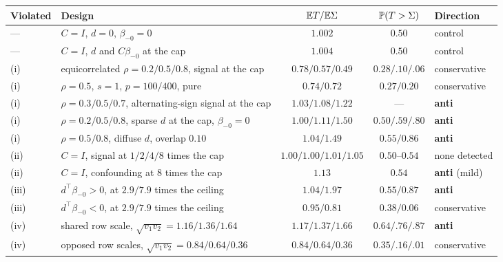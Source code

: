 {\begin{center}
\small
\setlength{\tabcolsep}{3pt}
\begin{tabular}{llccl}
\hline
Violated & Design & $\mathbb{E} T / \mathbb{E} \Sigma$ & $\mathbb{P}(T > \Sigma)$ & Direction
\\
\hline
--- & $C = I$, $d = 0$, $\beta_{-0} = 0$
  & $1.002$ & $0.50$ & control \\
--- & $C = I$, $d$ and $C\beta_{-0}$ at the cap
  & $1.004$ & $0.50$ & control \\[2pt]
(i) & equicorrelated $\rho = 0.2 / 0.5 / 0.8$, signal at the cap
  & $0.78 / 0.57 / 0.49$ & $0.28 / .10 / .06$ & conservative \\
(i) & $\rho = 0.5$, $s = 1$, $p = 100 / 400$, pure
  & $0.74 / 0.72$ & $0.27 / 0.20$ & conservative \\
(i) & $\rho = 0.3 / 0.5 / 0.7$, alternating-sign signal at the cap
  & $\mathbf{1.03 / 1.08 / 1.22}$ & --- & \textbf{anti} \\
(i) & $\rho = 0.2 / 0.5 / 0.8$, sparse $d$ at the cap, $\beta_{-0} = 0$
  & $\mathbf{1.00 / 1.11 / 1.50}$ & $0.50 / .59 / .80$ & \textbf{anti} \\
(i) & $\rho = 0.5 / 0.8$, diffuse $d$, overlap $0.10$
  & $\mathbf{1.04 / 1.49}$ & $0.55 / 0.86$ & \textbf{anti} \\[2pt]
(ii) & $C = I$, signal at $1/2/4/8$ times the cap
  & $1.00 / 1.00 / 1.01 / 1.05$ & $0.50$--$0.54$ & none detected \\
(ii) & $C = I$, confounding at $8$ times the cap
  & $1.13$ & $0.54$ & \textbf{anti} (mild) \\[2pt]
(iii) & $d^\top\beta_{-0} > 0$, at $2.9 / 7.9$ times the ceiling
  & $\mathbf{1.04 / 1.97}$ & $0.55 / 0.87$ & \textbf{anti} \\
(iii) & $d^\top\beta_{-0} < 0$, at $2.9 / 7.9$ times the ceiling
  & $0.95 / 0.81$ & $0.38 / 0.06$ & conservative \\[2pt]
(iv) & shared row scale, $\sqrt{v_1 v_2} = 1.16 / 1.36 / 1.64$
  & $\mathbf{1.17 / 1.37 / 1.66}$ & $0.64 / .76 / .87$ & \textbf{anti} \\
(iv) & opposed row scales, $\sqrt{v_1 v_2} = 0.84 / 0.64 / 0.36$
  & $0.84 / 0.64 / 0.36$ & $0.35 / .16 / .01$ & conservative \\
\hline
\end{tabular}
\end{center}

}
